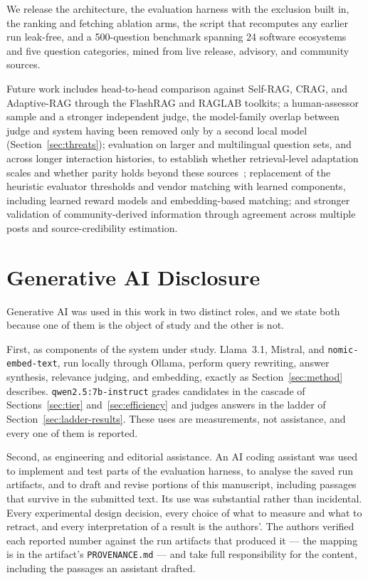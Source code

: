 \documentclass[acmsmall,review,anonymous,screen]{acmart}
\begin{document}
We release the architecture, the evaluation harness with the exclusion built
in, the ranking and fetching ablation arms, the script that recomputes any
earlier run leak-free, and a 500-question benchmark spanning 24 software
ecosystems and five question categories, mined from live release, advisory, and
community sources.

Future work includes head-to-head comparison against Self-RAG, CRAG, and
Adaptive-RAG through the FlashRAG and RAGLAB toolkits; a human-assessor sample and a stronger
independent judge, the model-family overlap between judge and system having been
removed only by a second local model (Section~\ref{sec:threats}); evaluation on larger
and multilingual question sets, and across longer interaction histories, to
establish whether retrieval-level adaptation scales and whether parity holds
beyond these sources~\cite{yang2024,ranaldi2025,reuter2025}; replacement of the
heuristic evaluator thresholds and vendor matching with learned components,
including learned reward models and embedding-based matching; and stronger
validation of community-derived information through agreement across multiple
posts and source-credibility estimation.

\section*{Generative AI Disclosure}

Generative AI was used in this work in two distinct roles, and we state both
because one of them is the object of study and the other is not.

First, as components of the system under study. Llama~3.1, Mistral, and
\texttt{nomic-embed-text}, run locally through Ollama, perform query rewriting,
answer synthesis, relevance judging, and embedding, exactly as Section~\ref{sec:method}
describes. \texttt{qwen2.5:7b-instruct} grades candidates in the cascade of
Sections~\ref{sec:tier} and~\ref{sec:efficiency} and judges answers in the
ladder of Section~\ref{sec:ladder-results}. These uses are measurements, not
assistance, and every one of them is reported.

Second, as engineering and editorial assistance. An AI coding assistant was used
to implement and test parts of the evaluation harness, to analyse the saved run
artifacts, and to draft and revise portions of this manuscript, including
passages that survive in the submitted text. Its use was substantial rather than
incidental. Every experimental design decision, every choice of what to measure
and what to retract, and every interpretation of a result is the authors'. The
authors verified each reported number against the run artifacts that produced
it --- the mapping is in the artifact's \texttt{PROVENANCE.md} --- and take full
responsibility for the content, including the passages an assistant drafted.
\end{document}
